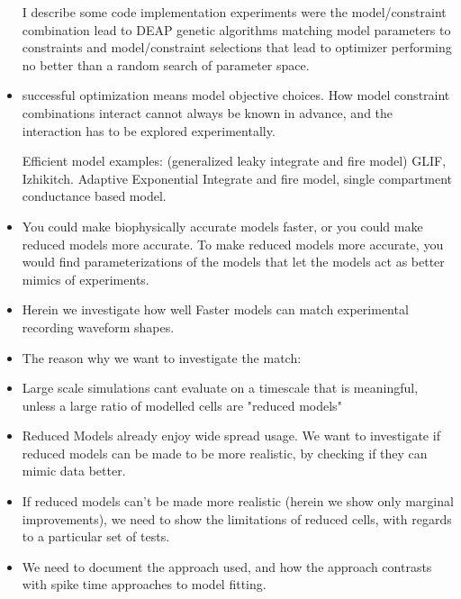 \documentclass{article}
\begin{document}
\begin{itemize}
I describe some code implementation experiments were the model/constraint combination lead to DEAP genetic algorithms matching model parameters to constraints and model/constraint selections that lead to optimizer performing no better than a random search of parameter space.


\item successful optimization means model objective choices. How model constraint combinations interact cannot always be known in advance, and the interaction has to be explored experimentally.

Efficient model examples: (generalized leaky integrate and fire model) GLIF, Izhikitch. Adaptive Exponential Integrate and fire model, single compartment conductance based model. 

\item You could make biophysically accurate models faster, or you could make reduced models more accurate. To make reduced models more accurate, you would find parameterizations of the models that let the models act as better mimics of experiments.
\item Herein we investigate how well Faster models can match experimental recording waveform shapes.
\item The reason why we want to investigate the match:
\item Large scale simulations cant evaluate on a timescale that is meaningful, unless a large ratio of modelled cells are "reduced models"
\item Reduced Models already enjoy wide spread usage. We want to investigate if reduced models can be made to be more realistic, by checking if they can mimic data better.
\item If reduced models can't be made more realistic (herein we show only marginal improvements), we need to show the limitations of reduced cells, with regards to a particular set of tests.
\item We need to document the approach used, and how the approach contrasts with spike time approaches to model fitting.
\end{itemize}
\end{document}
